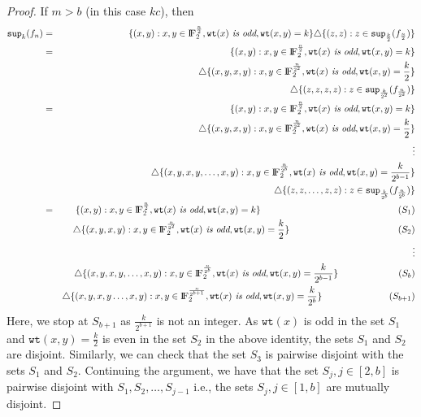 \documentclass{article}[12pt]
\newcommand{\FF}{{\rm I\!F}}
\newcommand{\wt}{\mathtt{wt}}
\newcommand{\spt}{\mathtt{sup}}
\begin{document}
\begin{proof}
If $m > b$ (in this case $kc$), then
\begin{eqnarray*}
\spt_k(f_n) & = &\{(x,y) : x,y \in \FF_2^{\frac{n}{2}}, \wt(x) \textit{ is odd}, \wt(x,y) = k \} \triangle \{(z,z) : z \in \spt_\frac{k}{2}(f_{\frac{n}{2}})\}\\
& = &\{(x,y) : x,y \in \FF_2^{\frac{n}{2}}, \wt(x) \textit{ is odd}, \wt(x,y) = k\} \\ & &\triangle \{(x,y,x,y) : x,y \in \FF_2^{\frac{n}{2^2}}, \wt(x) \textit{ is odd},  \wt(x,y) = \frac{k}{2}\} \\ 
& & \triangle \{(z,z,z,z) : z \in \spt_\frac{k}{2^2}(f_{\frac{n}{2^2}})\} \\
& = &\{(x,y) : x,y \in \FF_2^{\frac{n}{2}}, \wt(x) \textit{ is odd}, \wt(x,y) = k\} \\ & &\triangle \{(x,y,x,y) : x,y \in \FF_2^{\frac{n}{2^2}}, \wt(x) \textit{ is odd},  \wt(x,y) = \frac{k}{2}\} \\ 
& & \vdots \\
& &\triangle \{(x,y,x,y, \ldots,x,y) : x,y \in \FF_2^{\frac{n}{2^b}}, \wt(x) \textit{ is odd},  \wt(x,y) = \frac{k}{2^{b-1}}\} \\
& & \triangle \{(z,z,\ldots, z,z) : z \in \spt_\frac{k}{2^b}(f_{\frac{n}{2^b}})\} \\
& = &\{(x,y) : x,y \in \FF_2^{\frac{n}{2}}, \wt(x) \textit{ is odd}, \wt(x,y) = k\} \hspace{2.05in} (S_1) \\ 
& &\triangle \{(x,y,x,y) : x,y \in \FF_2^{\frac{n}{2^2}}, \wt(x) \textit{ is odd},  \wt(x,y) = \frac{k}{2}\}\hspace{1.62in}(S_2)\\ 
& & \vdots \\
& &\triangle \{(x,y,x,y, \ldots,x,y) : x,y \in \FF_2^{\frac{n}{2^b}}, \wt(x) \textit{ is odd},  \wt(x,y) = \frac{k}{2^{b-1}}\} \hspace{0.9in}(S_b)\\
& & \triangle \{(x,y,x,y\ldots, x,y) : x,y \in \FF_2^{\frac{n}{2^{b+1}}}, \wt(x) \textit{ is odd},  \wt(x,y) = \frac{k}{2^b}\}\hspace{1.0in}(S_{b+1})
\end{eqnarray*}
Here, we stop at $S_{b+1}$ as $\frac{k}{2^{b+1}}$ is not an integer. As $\wt(x)$ is odd in the set $S_1$ and $\wt(x,y) = \frac{k}{2}$ is even in the set $S_2$ in the above identity, the sets $S_1$ and $S_2$ are disjoint. Similarly, we can check that the set $S_3$ is pairwise disjoint with the sets $S_1$ and $S_2$. Continuing the argument, we have that the set $S_j, j \in [2,b]$ is pairwise disjoint with $S_1, S_2, \ldots, S_{j-1}$ i.e., the sets $S_j, j \in [1,b]$ are mutually disjoint. 

\end{proof}
\end{document}
